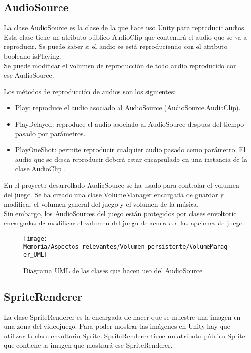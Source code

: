 \subsection{AudioSource}
La clase AudioSource es la clase de la que hace uso Unity para reproducir audios. Esta clase tiene un atributo público AudioClip que contendrá el audio que se va a reproducir. Se puede saber si el audio se está reproduciendo con el atributo booleano isPlaying.\\
Se puede modificar el volumen de reproducción de todo audio reproducido con ese AudioSource.

Los métodos de reproducción de audios son los siguientes:
\begin{itemize}
\item
Play: reproduce el audio asociado al AudioSource (AudioSource.AudioClip).
\item
PlayDelayed: reproduce el audio asociado al AudioSource despues del tiempo pasado por parámetros.
\item
PlayOneShot: permite reproducir cualquier audio pasado como parámetro. El audio que se desea reproducir deberá estar encapsulado en una instancia de la clase AudioClip \cite{AudioClip}.
\end{itemize}

En el proyecto desarrollado AudioSource se ha usado para controlar el volumen del juego. Se ha creado una clase VolumeManager encargada de guardar y modificar el volumen general del juego y el volumen de la música.\\
Sin embargo, los AudioSources del juego están protegidos por clases envoltorio encargadas de modificar el volumen del juego de acuerdo a las opciones de juego.

\begin{figure}[h]
\texttt{[image: Memoria/Aspectos\_relevantes/Volumen\_persistente/VolumeManager\_UML]}
\caption{Diagrama UML de las clases que hacen uso del AudioSource}
\end{figure}

\subsection{SpriteRenderer}
La clase SpriteRenderer es la encargada de hacer que se muestre una imagen en una zona del videojuego. Para poder mostrar las imágenes en Unity hay que utilizar la clase envoltorio Sprite. SpriteRenderer tiene un atributo público Sprite que contiene la imagen que mostrará ese SpriteRenderer.

